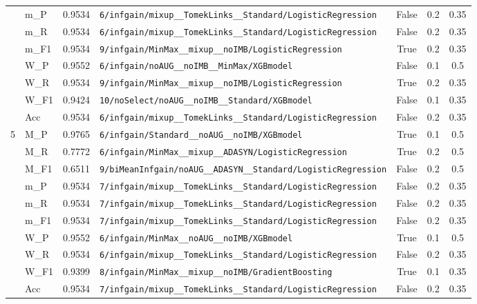 \begin{table}[htbp]
\begin{tabular}{|c|l|c|>{\ttfamily\footnotesize}p{7.2cm}|c|c|c|}
 & m\_P & 0.9534 & \texttt{6/infgain/mixup\_\_TomekLinks\_\_Standard/LogisticRegression} & False & 0.2 & 0.35 \\
 & m\_R & 0.9534 & \texttt{6/infgain/mixup\_\_TomekLinks\_\_Standard/LogisticRegression} & False & 0.2 & 0.35 \\
 & m\_F1 & 0.9534 & \texttt{9/infgain/MinMax\_\_mixup\_\_noIMB/LogisticRegression} & True & 0.2 & 0.35 \\
 & W\_P & 0.9552 & \texttt{6/infgain/noAUG\_\_noIMB\_\_MinMax/XGBmodel} & False & 0.1 & 0.5 \\
 & W\_R & 0.9534 & \texttt{9/infgain/MinMax\_\_mixup\_\_noIMB/LogisticRegression} & True & 0.2 & 0.35 \\
 & W\_F1 & 0.9424 & \texttt{10/noSelect/noAUG\_\_noIMB\_\_Standard/XGBmodel} & False & 0.1 & 0.35 \\
 & Acc & 0.9534 & \texttt{6/infgain/mixup\_\_TomekLinks\_\_Standard/LogisticRegression} & False & 0.2 & 0.35 \\
\hline
\multirow{10}{*}{5} & M\_P & 0.9765 & \texttt{6/infgain/Standard\_\_noAUG\_\_noIMB/XGBmodel} & True & 0.1 & 0.5 \\
 & M\_R & 0.7772 & \texttt{6/infgain/MinMax\_\_mixup\_\_ADASYN/LogisticRegression} & True & 0.2 & 0.5 \\
 & M\_F1 & 0.6511 & \texttt{9/biMeanInfgain/noAUG\_\_ADASYN\_\_Standard/LogisticRegression} & False & 0.2 & 0.5 \\
 & m\_P & 0.9534 & \texttt{7/infgain/mixup\_\_TomekLinks\_\_Standard/LogisticRegression} & False & 0.2 & 0.35 \\
 & m\_R & 0.9534 & \texttt{7/infgain/mixup\_\_TomekLinks\_\_Standard/LogisticRegression} & False & 0.2 & 0.35 \\
 & m\_F1 & 0.9534 & \texttt{7/infgain/mixup\_\_TomekLinks\_\_Standard/LogisticRegression} & False & 0.2 & 0.35 \\
 & W\_P & 0.9552 & \texttt{6/infgain/MinMax\_\_noAUG\_\_noIMB/XGBmodel} & True & 0.1 & 0.5 \\
 & W\_R & 0.9534 & \texttt{6/infgain/mixup\_\_TomekLinks\_\_Standard/LogisticRegression} & False & 0.2 & 0.35 \\
 & W\_F1 & 0.9399 & \texttt{8/infgain/MinMax\_\_mixup\_\_noIMB/GradientBoosting} & True & 0.1 & 0.35 \\
 & Acc & 0.9534 & \texttt{7/infgain/mixup\_\_TomekLinks\_\_Standard/LogisticRegression} & False & 0.2 & 0.35 \\
\hline
\end{tabular}
\end{table}
